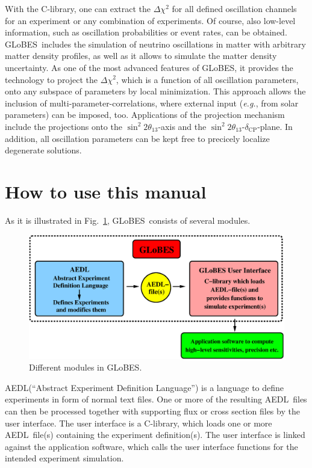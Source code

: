 \documentclass[a4paper,12pt,twoside]{book}
\newcommand{\deltacp}{\delta_{\mathrm{CP}}}
\newcommand{\stheta}{\sin^2 2 \theta_{13}}
\newcommand{\eg}{{\it e.g.}}
\newcommand{\fig}{Fig.}
\newcommand{\GLOBES}{{\sf GLoBES}}
\newcommand{\AEDL}{{\sf AEDL}}
\newcommand{\figu}[1]{\fig~\ref{fig:#1}}
\begin{document}
With the C-library, one can extract the $\Delta \chi^2$ for all defined 
oscillation channels for an experiment or any combination of experiments.
Of course, also low-level information, such as oscillation
probabilities or event rates, can be obtained. \GLOBES\ includes the
simulation of neutrino oscillations in matter with arbitrary matter 
density profiles, as well as it allows to simulate the matter density
uncertainty. As one of the most
advanced features of \GLOBES , it provides the technology to 
project the $\Delta \chi^2$, which is a function of all oscillation
parameters, onto any subspace of parameters by local minimization. 
This approach allows the inclusion of multi-parameter-correlations,
where external input (\eg, from solar parameters) can be imposed, too.
Applications of the projection mechanism include the projections onto the $\stheta$-axis and the $\stheta$-$\deltacp$-plane. In addition, all oscillation parameters can be kept free to precicely localize 
degenerate solutions.

\cleardoublepage
\tableofcontents

\cleardoublepage
\setcounter{page}{1}

\chapter*{How to use this manual}

As it is illustrated in \figu{GLOBES}, \GLOBES\ consists 
of several modules.
%
\begin{figure}[bht]
\begin{center}
\includegraphics[width=16cm]{GLOBES}
\end{center}
\caption{\label{fig:GLOBES} Different modules in \GLOBES .}
\end{figure}
%
\AEDL (``Abstract Experiment Definition Language'') is a language
to define experiments in form of normal text files. One or more of 
the resulting \AEDL\ files can then be processed together with supporting 
flux or cross section files by the user interface. The user interface
is a C-library, which loads one or more \AEDL\ file(s)
containing the experiment definition(s). The user interface is linked 
against the application software, which calls the user interface functions
for the intended experiment simulation. 
\end{document}
